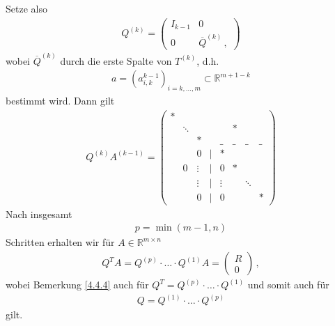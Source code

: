 \documentclass[ngerman,fontsize=11pt, paper=a4, parskip=half, titlepage=true, toc=bib]{scrbook}
\newcommand{\R}{\mathds{R}}
\begin{document}
	  Setze also
	  \begin{gather}
	  	Q^{(k)} = \begin{pmatrix}
	  	 I_{k-1} & 0 \\
	  	 0 & \overline{Q}^{(k)} \, ,
	  	 \label{IV.4.13}
	  	\end{pmatrix}
	  \end{gather}
	  wobei $\overline{Q}^{(k)} $ durch die erste Spalte von $T^{(k)}$, d.h.
	  \begin{gather}
	  	a= (a_{i,k}^{k-1})_{i=k,\dotsc, m} \subset \R^{m+1-k}
	  	\label{IV.4.14}
	  \end{gather}
	  bestimmt wird. Dann gilt
	  \begin{gather*}
	  	Q^{(k)}A^{(k-1)} =
	  	 \begin{pmatrix}
	  	*  &&&&&\\
	  	&\ddots &&&& * \\
	  	&&*&&\_&\_&\_&\_ \\
	  	&&0&|&* \\
	  	&0&\vdots&|&0&* \\
	  	&&\vdots&  |&\vdots &&\ddots\\
	  	&&0&  |&0&&&*
	  	\end{pmatrix}
	  \end{gather*}
	  Nach insgesamt 
	  \begin{gather}
	  	p=\min (m-1, n)
	  	\label{IV.4.15}
	  \end{gather}
	  Schritten erhalten wir für $A\in \R^{m\times n}$
	  \begin{gather}
	  Q^TA = Q^{(p)}\cdot \dotsc \cdot Q^{(1)}A 
	  			= \begin{pmatrix} R\\0\end{pmatrix}\, ,
	  \end{gather}
	  wobei Bemerkung \ref{4.4.4} auch für 
	  $Q^T= Q^{(p)}\cdot \dotsc \cdot Q^{(1)} $ und somit auch für
	  \begin{gather}
	  	Q = Q^{(1)}\cdot \dotsc \cdot Q^{(p)}
	  	\label{IV.4.16}
	  \end{gather}
	  gilt.
	  
	  
	  
\end{document}
